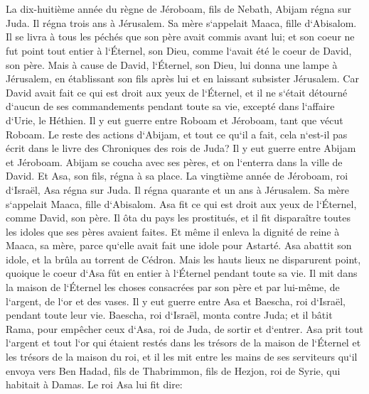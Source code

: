 \chapter{}

\verse La dix-huitième année du règne de Jéroboam, fils de Nebath, Abijam régna sur Juda. 
\verse Il régna trois ans à Jérusalem. Sa mère s`appelait Maaca, fille d`Abisalom. 
\verse Il se livra à tous les péchés que son père avait commis avant lui; et son coeur ne fut point tout entier à l`Éternel, son Dieu, comme l`avait été le coeur de David, son père. 
\verse Mais à cause de David, l`Éternel, son Dieu, lui donna une lampe à Jérusalem, en établissant son fils après lui et en laissant subsister Jérusalem. 
\verse Car David avait fait ce qui est droit aux yeux de l`Éternel, et il ne s`était détourné d`aucun de ses commandements pendant toute sa vie, excepté dans l`affaire d`Urie, le Héthien. 
\verse Il y eut guerre entre Roboam et Jéroboam, tant que vécut Roboam. 
\verse Le reste des actions d`Abijam, et tout ce qu`il a fait, cela n`est-il pas écrit dans le livre des Chroniques des rois de Juda? Il y eut guerre entre Abijam et Jéroboam. 
\verse Abijam se coucha avec ses pères, et on l`enterra dans la ville de David. Et Asa, son fils, régna à sa place. 
\verse La vingtième année de Jéroboam, roi d`Israël, Asa régna sur Juda. 
\verse Il régna quarante et un ans à Jérusalem. Sa mère s`appelait Maaca, fille d`Abisalom. 
\verse Asa fit ce qui est droit aux yeux de l`Éternel, comme David, son père. 
\verse Il ôta du pays les prostitués, et il fit disparaître toutes les idoles que ses pères avaient faites. 
\verse Et même il enleva la dignité de reine à Maaca, sa mère, parce qu`elle avait fait une idole pour Astarté. Asa abattit son idole, et la brûla au torrent de Cédron. 
\verse Mais les hauts lieux ne disparurent point, quoique le coeur d`Asa fût en entier à l`Éternel pendant toute sa vie. 
\verse Il mit dans la maison de l`Éternel les choses consacrées par son père et par lui-même, de l`argent, de l`or et des vases. 
\verse Il y eut guerre entre Asa et Baescha, roi d`Israël, pendant toute leur vie. 
\verse Baescha, roi d`Israël, monta contre Juda; et il bâtit Rama, pour empêcher ceux d`Asa, roi de Juda, de sortir et d`entrer. 
\verse Asa prit tout l`argent et tout l`or qui étaient restés dans les trésors de la maison de l`Éternel et les trésors de la maison du roi, et il les mit entre les mains de ses serviteurs qu`il envoya vers Ben Hadad, fils de Thabrimmon, fils de Hezjon, roi de Syrie, qui habitait à Damas. Le roi Asa lui fit dire: 
